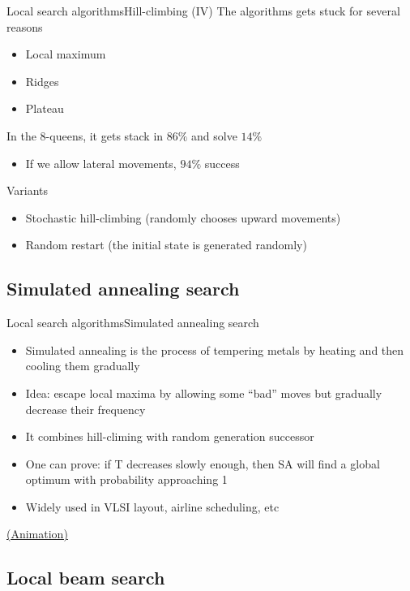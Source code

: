 \documentclass[10pt,compress]{beamer} %
\begin{document}
\begin{frame}{Local search algorithms}{Hill-climbing (IV)}
    The algorithms gets stuck for several reasons
    \begin{itemize}
        \item Local maximum
        \item Ridges
        \item Plateau
    \end{itemize}
    In the 8-queens, it gets stack in $86\%$ and solve $14\%$
    \begin{itemize}
        \item If we allow lateral movements, $94\%$ success
    \end{itemize}
    Variants
    \begin{itemize}
        \item Stochastic hill-climbing (randomly chooses upward movements)
        \item Random restart (the initial state is generated randomly)
    \end{itemize}
\end{frame}

\subsection{Simulated annealing search}

\begin{frame}{Local search algorithms}{Simulated annealing search}
    \begin{itemize}
        \item Simulated annealing is the process of tempering metals by heating and then cooling them gradually
        \item Idea: escape local maxima by allowing some ``bad'' moves but gradually decrease their frequency
        \item It combines hill-climing with random generation successor
        \item One can prove: if T decreases slowly enough, then SA will find a global optimum with probability approaching 1
        \item Widely used in VLSI layout, airline scheduling, etc
    \end{itemize}
    \href{https://en.wikipedia.org/wiki/File:Hill\_Climbing\_with\_Simulated\_Annealing.gif}{(Animation)}
\end{frame}

\subsection{Local beam search}
\end{document}
